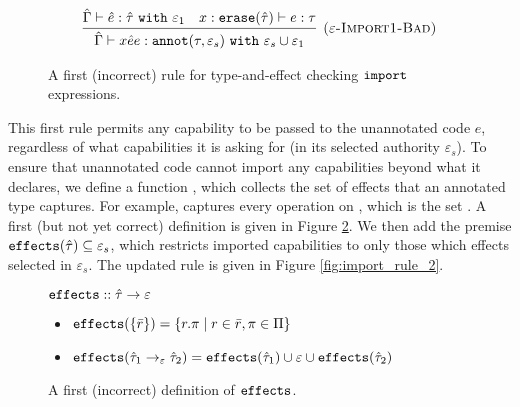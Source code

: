\begin{figure}[h]
\vspace{-0.5cm}
\[
\begin{array}{c}

\infer[\textsc{($\varepsilon$-Import1-Bad)}]
	{ \hat \Gamma \vdash {x}{\hat e}{e}: \kwa{annot}(\tau, \varepsilon_s)~\kw{with} \varepsilon_s \cup \varepsilon_1 }
	{ \hat \Gamma \vdash \hat e: \hat \tau~\kw{with} \varepsilon_1 & x: \kwa{erase}(\hat \tau) \vdash e: \tau }

\end{array}
\]
\vspace{-0.5cm}
\caption{A first (incorrect) rule for type-and-effect checking $\mathtt{import}$ expressions.}
\vspace{-0.5cm}
\label{fig:import_rule_1}
\end{figure}

This first rule permits any capability to be passed to the unannotated code $e$,
regardless of what capabilities it is asking for (in its selected authority
$\varepsilon_s$). To ensure that unannotated code cannot import any capabilities
beyond what it declares, we define a function , which collects the
set of effects that an annotated type captures. For example, 
captures every operation on , which is the set .
A first (but not yet correct) definition is given in Figure \ref{fig:fx_defn}. We then
add the premise $\mathtt{effects}(\hat \tau) \subseteq \varepsilon_s$, which
restricts imported capabilities to only those which effects selected in $\varepsilon_s$.
The updated rule is given in Figure \ref{fig:import_rule_2}.

\begin{figure}

$\mathtt{effects} :: \hat \tau \rightarrow \varepsilon$
\begin{itemize}
	\setlength\itemsep{-0.2em}
	\item[] $\mathtt{effects}(\{ \bar r \}) = \{ r.\pi \mid r \in \bar r, \pi \in \Pi \}$
	\item[] $\mathtt{effects}(\hat \tau_1 \rightarrow_{\varepsilon} \hat \tau_2) = \mathtt{effects}(\hat \tau_1) \cup \varepsilon \cup \mathtt{effects}(\hat \tau_2)$
\end{itemize}
\vspace{-0.3cm}
\caption{A first (incorrect) definition of $\mathtt{effects}$.}
\vspace{-0.3cm}
\label{fig:fx_defn}
\end{figure}

